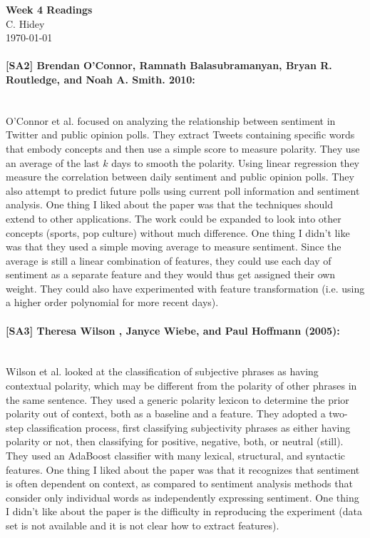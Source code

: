 \documentclass[12pt]{article}
\begin{document}
\begin{center}
  \textbf{Week 4 Readings} \\
  C. Hidey \\
  \today
\end{center}

\paragraph{{\bf [SA2] Brendan O'Connor, Ramnath Balasubramanyan, Bryan R. Routledge, and Noah A. Smith. 2010:}}
\text{} \\
O'Connor et al. focused on analyzing the relationship between sentiment in Twitter and public opinion polls.  They extract Tweets containing specific words that embody concepts and then use a simple score to measure polarity.  They use an average of the last $k$ days to smooth the polarity.  Using linear regression they measure the correlation between daily sentiment and public opinion polls.  They also attempt to predict future polls using current poll information and sentiment analysis.  One thing I liked about the paper was that the techniques should extend to other applications.  The work could be expanded to look into other concepts (sports, pop culture) without much difference.  One thing I didn't like was that they used a simple moving average to measure sentiment.  Since the average is still a linear combination of features, they could use each day of sentiment as a separate feature and they would thus get assigned their own weight.  They could also have experimented with feature transformation (i.e. using a higher order polynomial for more recent days).

\paragraph{{\bf [SA3] Theresa Wilson , Janyce Wiebe, and Paul Hoffmann (2005):}}
\text{} \\
Wilson et al. looked at the classification of subjective phrases as having contextual polarity, which may be different from the polarity of other phrases in the same sentence.
They used a generic polarity lexicon to determine the prior polarity out of context, both as a baseline and a feature.  They adopted a two-step classification process, first classifying subjectivity phrases as either having polarity or not, then classifying for positive, negative, both, or neutral (still).  They used an AdaBoost classifier with many lexical, structural, and syntactic features.  One thing I liked about the paper was that it recognizes that sentiment is often dependent on context, as compared to sentiment analysis methods that consider only individual words as independently expressing sentiment.  One thing I didn't like about the paper is the difficulty in reproducing the experiment (data set is not available and it is not clear how to extract features).
\end{document}
